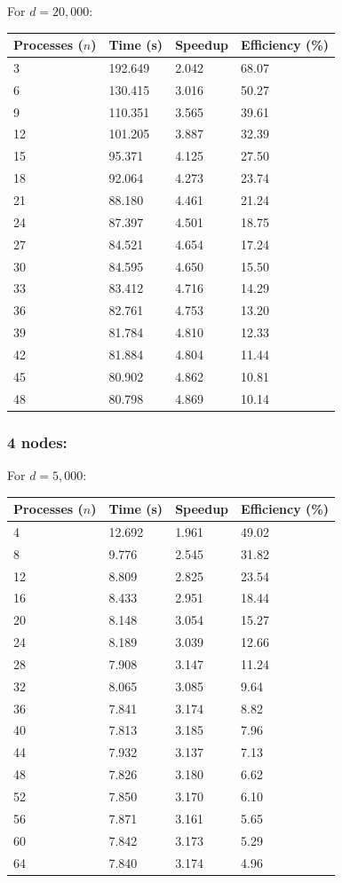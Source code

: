 \documentclass[11pt]{article}
\begin{document}
\begin{appendices}
\normalsize{
For $d=20,000$:}
\footnotesize{
\begin{center}
\begin{tabular}{|l|l|l|l|}
\hline
Processes ($n$) & Time (s) & Speedup & Efficiency (\%)\\
\hline
3 & 192.649 & 2.042 & 68.07\\
6 & 130.415 & 3.016 & 50.27\\
9 & 110.351 & 3.565 & 39.61\\
12 & 101.205 & 3.887 & 32.39\\
15 & 95.371 & 4.125 & 27.50\\
18 & 92.064 & 4.273 & 23.74\\
21 & 88.180 & 4.461 & 21.24\\
24 & 87.397 & 4.501 & 18.75\\
27 & 84.521 & 4.654 & 17.24\\
30 & 84.595 & 4.650 & 15.50\\
33 & 83.412 & 4.716 & 14.29\\
36 & 82.761 & 4.753 & 13.20\\
39 & 81.784 & 4.810 & 12.33\\
42 & 81.884 & 4.804 & 11.44\\
45 & 80.902 & 4.862 & 10.81\\
48 & 80.798 & 4.869 & 10.14\\
\hline
\end{tabular}
\end{center}}
\newpage
\subsubsection*{4 nodes:}
\normalsize{
For $d=5,000$:}
\footnotesize{
\begin{center}
\begin{tabular}{|l|l|l|l|}
\hline
Processes ($n$) & Time (s) & Speedup & Efficiency (\%)\\
\hline
4 & 12.692 & 1.961 & 49.02\\
8 & 9.776 & 2.545 & 31.82\\
12 & 8.809 & 2.825 & 23.54\\
16 & 8.433 & 2.951 & 18.44\\
20 & 8.148 & 3.054 & 15.27\\
24 & 8.189 & 3.039 & 12.66\\
28 & 7.908 & 3.147 & 11.24\\
32 & 8.065 & 3.085 & 9.64\\
36 & 7.841 & 3.174 & 8.82\\
40 & 7.813 & 3.185 & 7.96\\
44 & 7.932 & 3.137 & 7.13\\
48 & 7.826 & 3.180 & 6.62\\
52 & 7.850 & 3.170 & 6.10\\
56 & 7.871 & 3.161 & 5.65\\
60 & 7.842 & 3.173 & 5.29\\
64 & 7.840 & 3.174 & 4.96\\
\hline
\end{tabular}
\end{center}}


\end{appendices}
\end{document}
